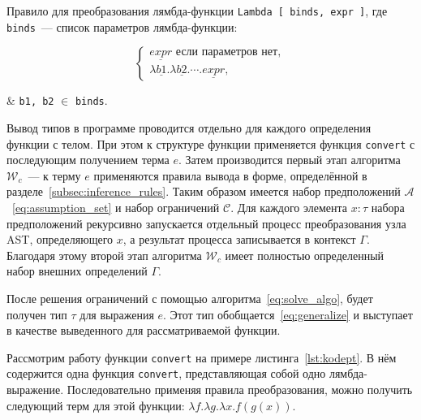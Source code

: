 Правило для преобразования лямбда-функции \lstinline{Lambda [ binds, expr ]}, где \lstinline{binds}~--- список параметров лямбда-функции:

\begin{equation}
    \label{eq:conv_lambda}
    \begin{cases}
        \underline{expr} \text{ если параметров нет}, \\
        \lambda \underline{b1}. \lambda \underline{b2}. \cdots. \underline{expr},
    \end{cases}
\end{equation}
\begin{eqrem}
    & \texttt{b1, b2} $\in$ \texttt{binds}.
\end{eqrem}

Вывод типов в программе проводится отдельно для каждого определения функции с телом.
При этом к структуре функции применяется функция \lstinline{convert} с последующим получением терма $e$.
Затем производится первый этап алгоритма $\mathcal{W}_c$~--- к терму $e$ применяются правила вывода в форме, определённой в разделе~\ref{subsec:inference_rules}.
Таким образом имеется набор предположений $\mathcal{A}$~\eqref{eq:assumption_set} и набор ограничений $\mathcal{C}$.
Для каждого элемента $x: \tau$ набора предположений рекурсивно запускается отдельный процесс преобразования узла AST, определяющего $x$, а результат процесса записывается в контекст $\Gamma$.
Благодаря этому второй этап алгоритма $\mathcal{W}_c$ имеет полностью определенный набор внешних определений $\Gamma$.

После решения ограничений с помощью алгоритма~\ref{eq:solve_algo}, будет получен тип $\tau$ для выражения $e$.
Этот тип обобщается~\eqref{eq:generalize} и выступает в качестве выведенного для рассматриваемой функции.

Рассмотрим работу функции \lstinline{convert} на примере листинга~\ref{lst:kodept}.
В нём содержится одна функция \lstinline{convert}, представляющая собой одно лямбда-выражение.
Последовательно применяя правила преобразования, можно получить следующий терм для этой функции: $\lambda f. \lambda g. \lambda x. f(g(x))$.

